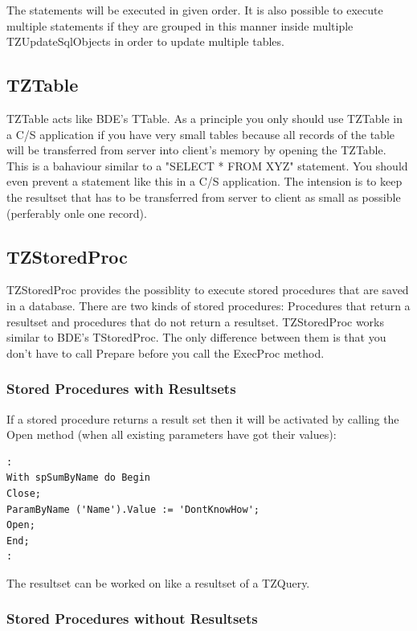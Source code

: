 \documentclass[a4paper,12pt,oneside]{book}
\begin{document}
The statements will be executed in given order.
It is also possible to execute multiple statements if they are grouped in this manner inside multiple TZUpdateSqlObjects in order to update multiple tables.

\subsection{TZTable}
TZTable acts like BDE's TTable.
As a principle you only should use TZTable in a C/S application if you have very small tables because all records of the table will be transferred from server into client's memory by
opening the TZTable.
This is a bahaviour similar to a "SELECT * FROM XYZ" statement.
You should even prevent a statement like this in a C/S application.
The intension is to keep the resultset that has to be transferred from server to client as small as possible (perferably onle one record).

\subsection{TZStoredProc}
TZStoredProc provides the possiblity to execute stored procedures that are saved in a database.
There are two kinds of stored procedures: Procedures that return a resultset and procedures that do not return a resultset.
TZStoredProc works similar to BDE's TStoredProc.
The only difference between them is that you don't have to call Prepare before you call the ExecProc method.

\subsubsection{Stored Procedures with Resultsets}

If a stored procedure returns a result set then it will be activated by calling the Open method (when all existing parameters have got their values):

\begin{verbatim}
:
With spSumByName do Begin
Close;
ParamByName ('Name').Value := 'DontKnowHow';
Open;
End;
:
\end{verbatim}

The resultset can be worked on like a resultset of a TZQuery.

\subsubsection{Stored Procedures without Resultsets}
\end{document}
